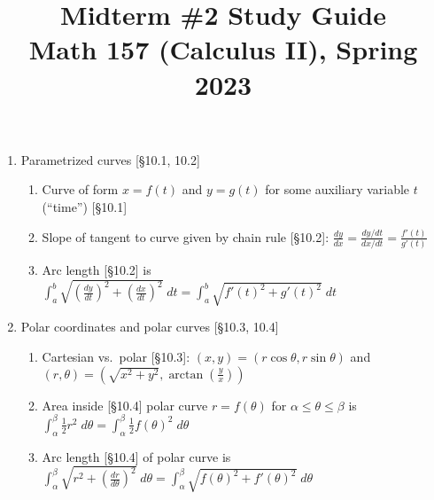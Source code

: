 \documentclass[11pt]{article}
\title{Midterm \#2 Study Guide \\ Math 157 (Calculus II), Spring 2023}
\date{}
\begin{document}
\maketitle

\thispagestyle{empty}

\vspace{-2cm}

\begin{enumerate}
\item Parametrized curves [\S10.1, 10.2]
\begin{enumerate}
\item Curve of form $x=f(t)$ and $y=g(t)$ for some auxiliary variable $t$ (``time'') [\S10.1]
\item Slope of tangent to curve given by chain rule [\S10.2]: $\frac{dy}{dx} = \frac{dy/dt}{dx/dt} = \frac{f'(t)}{g'(t)}$ 
\item Arc length [\S10.2] is $\int_{a}^{b} \sqrt{(\frac{dy}{dt})^2 + (\frac{dx}{dt})^2} \; dt = \int_{a}^{b} \sqrt{f'(t)^2 + g'(t)^2} \; dt$
\end{enumerate}

\item Polar coordinates and polar curves [\S10.3, 10.4]
\begin{enumerate}
\item Cartesian vs.~polar [\S10.3]: $(x,y) = (r\cos \theta, r \sin \theta)$ and $(r,\theta) = (\sqrt{x^2+y^2}, \arctan (\frac{y}{x}))$
\item Area inside [\S10.4] polar curve $r=f(\theta)$ for $\alpha \leq \theta \leq \beta$ is $\int_{\alpha}^{\beta} \frac{1}{2} r^2 \; d\theta=\int_{\alpha}^{\beta} \frac{1}{2} f(\theta)^2 \; d\theta$ 
\item Arc length [\S10.4] of polar curve is $\int_{\alpha}^{\beta} \sqrt{r^2 + (\frac{dr}{d\theta})^2} \; d\theta = \int_{\alpha}^{\beta} \sqrt{f(\theta)^2 + f'(\theta)^2} \; d\theta$ 
\end{enumerate}


\end{enumerate}
\end{document}
